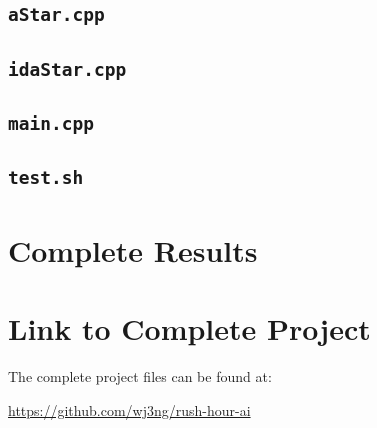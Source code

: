 \documentclass[12pt, a4paper]{article}
\begin{document}
\subsection{{\tt aStar.cpp}}


\subsection{{\tt idaStar.cpp}}


\subsection{{\tt main.cpp}}


\subsection{{\tt test.sh}}


\section{Complete Results}


\section{Link to Complete Project}

The complete project files can be found at:

\url{https://github.com/wj3ng/rush-hour-ai}
\end{document}
